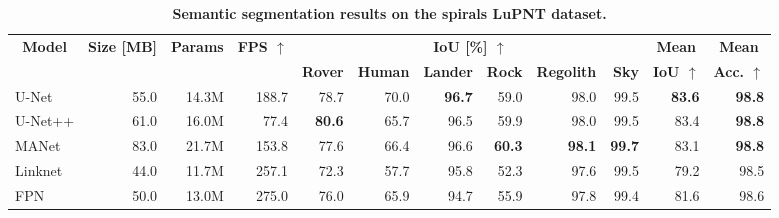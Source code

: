 \begin{table}[t!]
	\centering
	\caption{\bfseries Semantic segmentation results on the spirals LuPNT dataset.}
	\label{tab:semantic_segmentation_models}
	\small
	\begin{tabular}{|l rrrrrrrrrrr|}
		\hline
		\multicolumn{1}{|c}{\multirow{2}{*}{\textbf{Model}}}         &
		\multicolumn{1}{c}{\multirow{2}{*}{\textbf{Size [MB]}}}      &
		\multicolumn{1}{c}{\multirow{2}{*}{\textbf{Params}}}         &
		\multicolumn{1}{c}{\multirow{2}{*}{\textbf{FPS $\uparrow$}}} &
		\multicolumn{6}{c}{\textbf{IoU [\%] $\uparrow$}}             &
		\multicolumn{1}{c}{\textbf{Mean}}                            &
		\multicolumn{1}{c|}{\textbf{Mean}}
		\\
		\cmidrule{4-9}
		                                                             &              &               &                &
		\textbf{Rover}                                               &
		\textbf{Human}                                               &
		\textbf{Lander}                                              &
		\textbf{Rock}                                                &
		\textbf{Regolith}                                            &
		\textbf{Sky}                                                 &
		\multicolumn{1}{c}{\textbf{IoU $\uparrow$}}                  &
		\multicolumn{1}{c|}{\textbf{Acc. $\uparrow$}}
		\\
		\hline
		\hline
		U-Net                                                        & 55.0         & 14.3M         & 188.7          & 78.7          & 70.0          & \textbf{96.7} & 59.0          & 98.0          & 99.5          & \textbf{83.6} & \textbf{98.8} \\
		U-Net++                                                      & 61.0         & 16.0M         & 77.4           & \textbf{80.6} & 65.7          & 96.5          & 59.9          & 98.0          & 99.5          & 83.4          & \textbf{98.8} \\
		MANet                                                        & 83.0         & 21.7M         & 153.8          & 77.6          & 66.4          & 96.6          & \textbf{60.3} & \textbf{98.1} & \textbf{99.7} & 83.1          & \textbf{98.8} \\
		Linknet                                                      & 44.0         & 11.7M         & 257.1          & 72.3          & 57.7          & 95.8          & 52.3          & 97.6          & 99.5          & 79.2          & 98.5          \\
		FPN                                                          & 50.0         & 13.0M         & 275.0          & 76.0          & 65.9          & 94.7          & 55.9          & 97.8          & 99.4          & 81.6          & 98.6          \\

\end{tabular}
\end{table}
